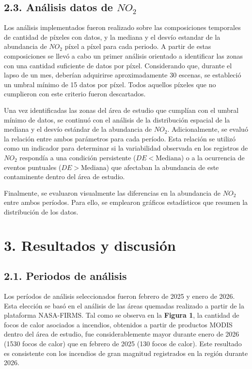 \documentclass[
  spanish,
  11pt,
]{article}
\begin{document}
\subsection{\texorpdfstring{2.3. Análisis datos de
\(NO_{2}\)}{2.3. Análisis datos de NO\_\{2\}}}\label{anuxe1lisis-datos-de-no_2}

Los análisis implementados fueron realizado sobre las composiciones
temporales de cantidad de píxeles con datos, y la mediana y el desvío
estandar de la abundancia de \(NO_{2}\) píxel a píxel para cada periodo.
A partir de estas composiciones se llevó a cabo un primer análisis
orientado a identificar las zonas con una cantidad suficiente de datos
por píxel. Considerando que, durante el lapso de un mes, deberían
adquirirse aproximadamente 30 escenas, se estableció un umbral mínimo de
15 datos por píxel. Todos aquellos píxeles que no cumplieron con este
criterio fueron descartados.

Una vez identificadas las zonas del área de estudio que cumplían con el
umbral mínimo de datos, se continuó con el análisis de la distribución
espacial de la mediana y el desvío estándar de la abundancia de
\(NO_{2}\). Adicionalmente, se evaluó la relación entre ambos parámetros
para cada período. Esta relación se utilizó como un indicador para
determinar si la variabilidad observada en los registros de \(NO_{2}\)
respondía a una condición persistente (\(DE < \text{Mediana}\)) o a la
ocurrencia de eventos puntuales (\(DE > \text{Mediana}\)) que afectaban
la abundancia de este contaminente dentro del área de estudio.

Finalmente, se evaluaron visualmente las diferencias en la abundancia de
\(NO_{2}\) entre ambos períodos. Para ello, se emplearon gráficos
estadísticos que resumen la distribución de los datos.

\section{3. Resultados y discusión}\label{resultados-y-discusiuxf3n}

\subsection{2.1. Periodos de análisis}\label{periodos-de-anuxe1lisis}

Los períodos de análisis seleccionados fueron febrero de 2025 y enero de
2026. Esta elección se basó en el análisis de las áreas quemadas
realizado a partir de la plataforma NASA-FIRMS. Tal como se observa en
la \textbf{Figura 1}, la cantidad de focos de calor asociados a
incendios, obtenidos a partir de productos MODIS dentro del área de
estudio, fue considerablemente mayor durante enero de 2026 (1530 focos
de calor) que en febrero de 2025 (130 focos de calor). Este resultado es
consistente con los incendios de gran magnitud registrados en la región
durante 2026.
\end{document}
